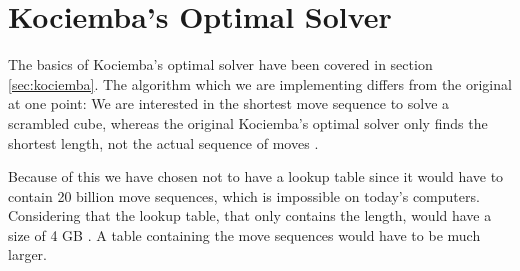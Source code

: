 \chapter{Kociemba's Optimal Solver}
\label{chap:kociembaImplement}
The basics of Kociemba's optimal solver have been covered in section \ref{sec:kociemba}. The algorithm which we are implementing differs from the original at one point:
We are interested in the shortest move sequence to solve a scrambled cube, whereas the original Kociemba's optimal solver only finds the shortest length, not the actual sequence of moves \cite{rokicki09}.

Because of this we have chosen not to have a lookup table since it would have to contain 20 billion move sequences, which is impossible on today's computers. Considering that the lookup table, that only contains the length, would have a size of 4 GB \cite{cubeExplorer}. A table containing the move sequences would have to be much larger.

